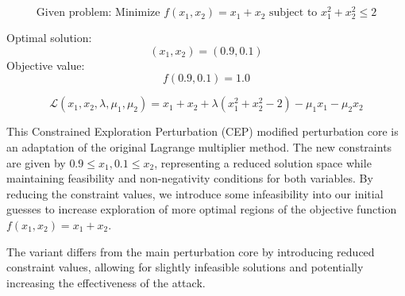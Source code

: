 \[
\text{Given problem: Minimize } f(x_1, x_2) = x_1 + x_2 \text{ subject to } x_1^2 + x_2^2 \leq 2
\]

Optimal solution: 
\[
(x_1, x_2) = (0.9, 0.1)
\]
Objective value: 
\[
f(0.9, 0.1) = 1.0
\]

\[
\mathcal{L}(x_1, x_2, \lambda, \mu_1, \mu_2) = x_1 + x_2 + \lambda (x_1^2 + x_2^2 - 2) - \mu_1 x_1 - \mu_2 x_2
\]

This Constrained Exploration Perturbation (CEP) modified perturbation core is an adaptation of the original Lagrange multiplier method. The new constraints are given by $0.9 \leq x_1, 0.1 \leq x_2$, representing a reduced solution space while maintaining feasibility and non-negativity conditions for both variables. By reducing the constraint values, we introduce some infeasibility into our initial guesses to increase exploration of more optimal regions of the objective function $f(x_1,x_2) = x_1 + x_2$.

The variant differs from the main perturbation core by introducing reduced constraint values, allowing for slightly infeasible solutions and potentially increasing the effectiveness of the attack.